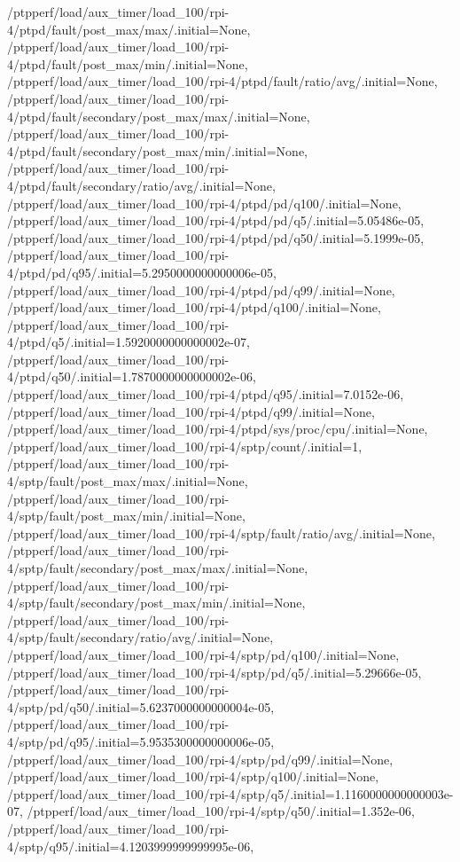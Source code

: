 {    /ptpperf/load/aux_timer/load_100/rpi-4/ptpd/fault/post_max/max/.initial=None,
    /ptpperf/load/aux_timer/load_100/rpi-4/ptpd/fault/post_max/min/.initial=None,
    /ptpperf/load/aux_timer/load_100/rpi-4/ptpd/fault/ratio/avg/.initial=None,
    /ptpperf/load/aux_timer/load_100/rpi-4/ptpd/fault/secondary/post_max/max/.initial=None,
    /ptpperf/load/aux_timer/load_100/rpi-4/ptpd/fault/secondary/post_max/min/.initial=None,
    /ptpperf/load/aux_timer/load_100/rpi-4/ptpd/fault/secondary/ratio/avg/.initial=None,
    /ptpperf/load/aux_timer/load_100/rpi-4/ptpd/pd/q100/.initial=None,
    /ptpperf/load/aux_timer/load_100/rpi-4/ptpd/pd/q5/.initial=5.05486e-05,
    /ptpperf/load/aux_timer/load_100/rpi-4/ptpd/pd/q50/.initial=5.1999e-05,
    /ptpperf/load/aux_timer/load_100/rpi-4/ptpd/pd/q95/.initial=5.2950000000000006e-05,
    /ptpperf/load/aux_timer/load_100/rpi-4/ptpd/pd/q99/.initial=None,
    /ptpperf/load/aux_timer/load_100/rpi-4/ptpd/q100/.initial=None,
    /ptpperf/load/aux_timer/load_100/rpi-4/ptpd/q5/.initial=1.5920000000000002e-07,
    /ptpperf/load/aux_timer/load_100/rpi-4/ptpd/q50/.initial=1.7870000000000002e-06,
    /ptpperf/load/aux_timer/load_100/rpi-4/ptpd/q95/.initial=7.0152e-06,
    /ptpperf/load/aux_timer/load_100/rpi-4/ptpd/q99/.initial=None,
    /ptpperf/load/aux_timer/load_100/rpi-4/ptpd/sys/proc/cpu/.initial=None,
    /ptpperf/load/aux_timer/load_100/rpi-4/sptp/count/.initial=1,
    /ptpperf/load/aux_timer/load_100/rpi-4/sptp/fault/post_max/max/.initial=None,
    /ptpperf/load/aux_timer/load_100/rpi-4/sptp/fault/post_max/min/.initial=None,
    /ptpperf/load/aux_timer/load_100/rpi-4/sptp/fault/ratio/avg/.initial=None,
    /ptpperf/load/aux_timer/load_100/rpi-4/sptp/fault/secondary/post_max/max/.initial=None,
    /ptpperf/load/aux_timer/load_100/rpi-4/sptp/fault/secondary/post_max/min/.initial=None,
    /ptpperf/load/aux_timer/load_100/rpi-4/sptp/fault/secondary/ratio/avg/.initial=None,
    /ptpperf/load/aux_timer/load_100/rpi-4/sptp/pd/q100/.initial=None,
    /ptpperf/load/aux_timer/load_100/rpi-4/sptp/pd/q5/.initial=5.29666e-05,
    /ptpperf/load/aux_timer/load_100/rpi-4/sptp/pd/q50/.initial=5.6237000000000004e-05,
    /ptpperf/load/aux_timer/load_100/rpi-4/sptp/pd/q95/.initial=5.9535300000000006e-05,
    /ptpperf/load/aux_timer/load_100/rpi-4/sptp/pd/q99/.initial=None,
    /ptpperf/load/aux_timer/load_100/rpi-4/sptp/q100/.initial=None,
    /ptpperf/load/aux_timer/load_100/rpi-4/sptp/q5/.initial=1.1160000000000003e-07,
    /ptpperf/load/aux_timer/load_100/rpi-4/sptp/q50/.initial=1.352e-06,
    /ptpperf/load/aux_timer/load_100/rpi-4/sptp/q95/.initial=4.1203999999999995e-06,
}
